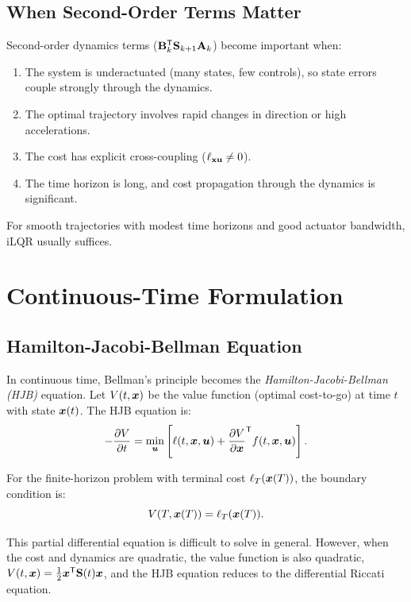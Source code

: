 \subsection{When Second-Order Terms Matter}

Second-order dynamics terms ($\mathbf{B}_k^{\mathsf{T}}\mathbf{S}_{k+1}\mathbf{A}_k$) become important when:
\begin{enumerate}
\item The system is underactuated (many states, few controls), so state errors couple strongly through the dynamics.
\item The optimal trajectory involves rapid changes in direction or high accelerations.
\item The cost has explicit cross-coupling ($\ell_{\mathbf{x}\mathbf{u}} \neq 0$).
\item The time horizon is long, and cost propagation through the dynamics is significant.
\end{enumerate}

For smooth trajectories with modest time horizons and good actuator bandwidth, iLQR usually suffices.

\section{Continuous-Time Formulation}

\subsection{Hamilton-Jacobi-Bellman Equation}

In continuous time, Bellman's principle becomes the \emph{Hamilton-Jacobi-Bellman (HJB)} equation. Let
$V(t,\bm{x})$ be the value function (optimal cost-to-go) at time $t$ with state $\bm{x}(t)$. The HJB equation is:
\begin{equation}
-\frac{\partial V}{\partial t} = \min_{\bm{u}} \left[\ell(t,\bm{x},\bm{u}) + \frac{\partial V}{\partial \bm{x}}^{\mathsf{T}} f(t,\bm{x},\bm{u})\right].
\label{eq:ch5:hjb}
\end{equation}

For the finite-horizon problem with terminal cost $\ell_T(\bm{x}(T))$, the boundary condition is:
\begin{equation}
V(T,\bm{x}(T)) = \ell_T(\bm{x}(T)).
\label{eq:ch5:hjb-boundary}
\end{equation}

This partial differential equation is difficult to solve in general. However, when the cost and dynamics are
quadratic, the value function is also quadratic, $V(t,\bm{x}) = \frac{1}{2}\bm{x}^{\mathsf{T}}\mathbf{S}(t)\bm{x}$, and the HJB equation
reduces to the differential Riccati equation.

